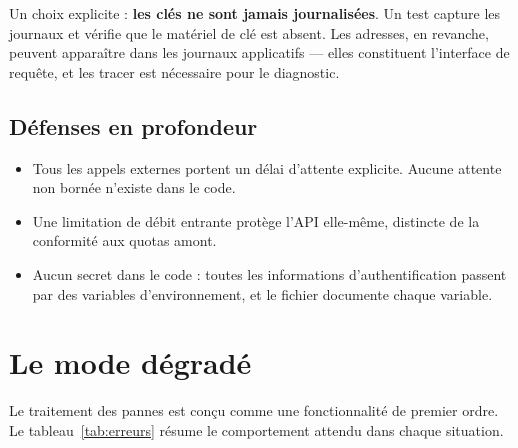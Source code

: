 Un choix explicite : \textbf{les clés ne sont jamais journalisées}. Un test
capture les journaux et vérifie que le matériel de clé est absent. Les adresses,
en revanche, peuvent apparaître dans les journaux applicatifs — elles
constituent l'interface de requête, et les tracer est nécessaire pour le
diagnostic.

\subsection{Défenses en profondeur}

\begin{itemize}[leftmargin=1.4em]
  \item Tous les appels externes portent un délai d'attente explicite. Aucune
        attente non bornée n'existe dans le code.
  \item Une limitation de débit entrante protège l'API \typhoon{} elle-même,
        distincte de la conformité aux quotas amont.
  \item Aucun secret dans le code : toutes les informations d'authentification
        passent par des variables d'environnement, et le fichier
         documente chaque variable.
\end{itemize}

\section{Le mode dégradé}

Le traitement des pannes est conçu comme une fonctionnalité de premier ordre.
Le tableau~\ref{tab:erreurs} résume le comportement attendu dans chaque
situation.

